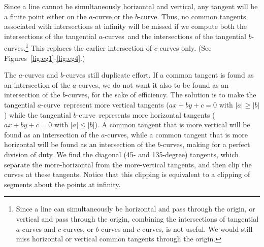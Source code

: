 \documentclass[10pt,twocolumn]{article}
\newif\ifTalk
\newcommand{\atang}{tangential $a$-curve\ }
\newcommand{\btang}{tangential $b$-curve\ }
\newcommand{\atangs}{tangential $a$-curves\ }
\begin{document}
Since a line cannot be simultaneously horizontal and vertical, 
any tangent will be a finite point either on the $a$-curve or the $b$-curve.
Thus, no common tangents associated with intersections at 
infinity will be missed if we compute both the intersections of the \atangs and
the intersections of the tangential $b$-curves.\footnote{Since a line can simultaneously be horizontal 
	and pass through the origin, or vertical and pass through the origin,
	combining the intersections of tangential $a$-curves and $c$-curves,
	or $b$-curves and $c$-curves, is not useful.
	We would still miss horizontal or vertical common tangents through the origin.}
This replaces the earlier intersection of $c$-curves only.
(See Figures~\ref{fig:eg1}-\ref{fig:eg4}.)
\ifTalk
The $a$-curves and $b$-curves cooperate to find all of the common tangents.
each individually has a blind spot, but together they see everything.
much like the three Fates that share an eyeball.
WANT NO MUTUALLY BLIND PARAMETER INTERVALS
We shall clip out a segment of a tangential curve about its point at infinity.
We must take care that the parameter interval of a clipped segment 
of one curve (when the curve is blind to common tangents) does not
overlap a parameter interval of a clipped segment of the other curve,
which would create a mutually blind interval where a common tangent
could be missed.
This is simply a matter of guaranteeing that the parameter intervals
of the clipped segments (blind regions) on both curves are kept disjoint.
\fi

The $a$-curves and $b$-curves still duplicate effort.
If a common tangent is found as an intersection of the $a$-curves,
we do not want it also to be found as an intersection of the $b$-curves,
for the sake of efficiency.
The solution is to make the \atang represent more vertical tangents
($ax+by+c=0$ with $|a| \geq |b|$)
while the \btang represents more horizontal tangents
($ax+by+c=0$ with $|a| \leq |b|$).
A common tangent that is more vertical will be found as an
intersection of the $a$-curves, while a common tangent that is more
horizontal will be found as an intersection of the $b$-curves,
making for a perfect division of duty.
We find the diagonal (45- and 135-degree) tangents,
which separate the more-horizontal from the more-vertical tangents,
and then clip the curves at these tangents.
Notice that this clipping is equivalent to a clipping of segments
about the points at infinity.
\end{document}
